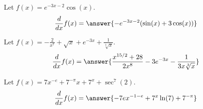 \documentclass{ximera}
\begin{document}
\begin{shuffle}
\begin{exercise}
Let $f(x)=e^{-3 x-2} \cos (x)$.
\[
\ddx f(x) = \answer{-e^{-3 x-2} (\sin (x)+3 \cos (x))}
\]
\end{exercise}

\begin{exercise}
Let $f(x)=-\frac{2}{x^7}+\sqrt{x}+e^{-3 x}+\frac{1}{\sqrt[3]{x}}$.
\[
\ddx f(x) = \answer{\frac{x^{15/2}+28}{2 x^8}-3 e^{-3 x}-\frac{1}{3 x \sqrt[3]{x}}}
\]
\end{exercise}


\begin{exercise}
Let $f(x)=7 x^{-e}+7^{-\pi } x+7^x+\sec ^7(2)$.
\[
\ddx f(x) = \answer{-7 e x^{-1-e}+7^x \ln (7)+7^{-\pi }}
\]
\end{exercise}

  
\end{shuffle}
\end{document}
